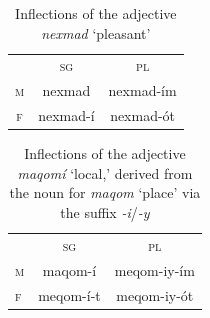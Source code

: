 \begin{description}
   \begin{table}[t]
      \small
      \centering
       \setlength{\extrarowheight}{8pt}
      \begin{tabular}{ccc} 
 \toprule
 & \textsc{sg} & \textsc{pl} \\
\cmidrule{2-3}
    \textsc{m} & nexmad & nexmad-\'{i}m \\
   \textsc{f} &  nexmad-\'{i} & nexmad-\'{o}t \\
    \bottomrule
    \end{tabular}
    \label{tab:non-y-adjs}
    \caption{Inflections of the adjective \textit{nexmad} `pleasant'}
    \end{table}


\begin{table}[bt]
\centering
\small
\setlength{\extrarowheight}{8pt}
\begin{tabular}{lcc}
\toprule
& \textsc{sg} & \textsc{pl}  \\
\cmidrule(lr){2-3}
\textsc{m} & maqom-\'{i} &  meqom-iy-\'{i}m\\
\textsc{f} & meqom-\'{i}-t  & meqom-iy-\'{o}t  \\
\bottomrule
\end{tabular}
\label{tab:der-adjs}
\caption{Inflections of the adjective \textit{maqom\'{i}} `local,' derived from the noun for \textit{maqom} `place' via the suffix \textit{-i}/\textit{-y}}
\end{table}


\end{description}

